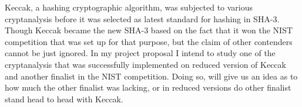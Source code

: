 \begin{abstractpage}
  Keccak, a hashing cryptographic algorithm, was subjected to various cryptanalysis before it was
  selected as latest standard for hashing in SHA-3. Though Keccak became the new SHA-3 based on 
  the fact that it won the NIST competition that was set up for that purpose, but the claim of other
  contenders cannot be just ignored. In my project proposal I intend to study one of the cryptanalysis
  that was successfully implemented on reduced version of Keccak and another finalist in the NIST
  competition. Doing so, will give us an idea as to how much the other finalist was lacking, or 
  in reduced versions do other finalist stand head to head with Keccak.
\end{abstractpage}

